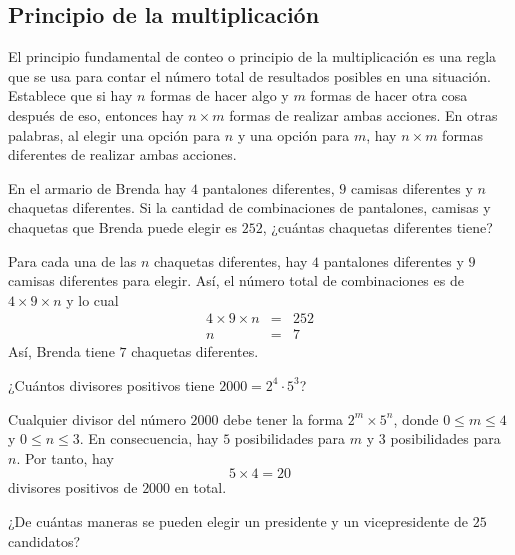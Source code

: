 \documentclass[12pt]{article}
\begin{document}
\subsection{Principio de la multiplicación}
\begin{definicion}
    El principio fundamental de conteo o principio de la multiplicación es una regla que se usa para contar el número total de resultados posibles en una situación. Establece que si hay $n$ formas de hacer algo y $m$ formas de hacer otra cosa después de eso, entonces hay $n\times m$ formas de realizar ambas acciones. En otras palabras, al elegir una opción para $n$ y una opción para $m$, hay $n \times m$ formas diferentes de realizar ambas acciones.
\end{definicion}

\begin{ejemplo}
    En el armario de Brenda hay $4$ pantalones diferentes, $9$ camisas diferentes y $n$ chaquetas diferentes. Si la cantidad de combinaciones de pantalones, camisas y chaquetas que Brenda puede elegir es $252$, ¿cuántas chaquetas diferentes tiene?
\end{ejemplo}

\begin{solucion}
    Para cada una de las $n$ chaquetas diferentes, hay $4$ pantalones diferentes y $9$ camisas diferentes para elegir. Así, el número total de combinaciones es de $4\times 9 \times n$ y lo cual
    \begin{eqnarray*}
        4\times 9 \times n&=&252\\
        n&=&7
    \end{eqnarray*}
    Así, Brenda tiene $7$ chaquetas diferentes.
\end{solucion}

\begin{ejemplo}
    ¿Cuántos divisores positivos tiene $2000=2^4\cdot 5^3$?
\end{ejemplo}

\begin{solucion}
    Cualquier divisor del número $2000$ debe tener la forma $2^m\times 5^n$, donde $0\leq m\leq 4$ y $0\leq n\leq 3$. En consecuencia, hay $5$ posibilidades para $m$ y $3$ posibilidades para $n$. Por tanto, hay
    \[5\times 4=20\]
    divisores positivos de $2000$ en total.
\end{solucion}

\begin{ejemplo}
    ¿De cuántas maneras se pueden elegir un presidente y un vicepresidente de $25$ candidatos?
\end{ejemplo}
\end{document}
